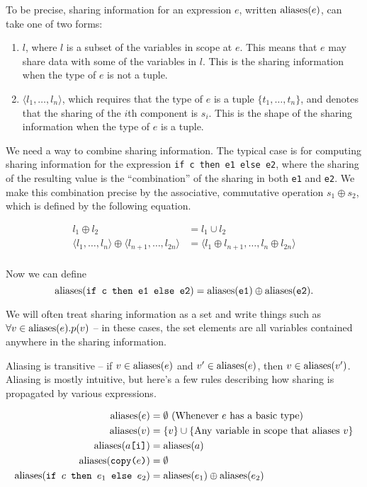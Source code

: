 To be precise, sharing information for an expression $e$, written
$\textrm{aliases}(e)$, can take one of two forms:

\begin{enumerate}
\item $l$, where $l$ is a subset of the variables in scope at $e$.
  This means that $e$ may share data with some of the variables in
  $l$.  This is the sharing information when the type of $e$ is not a
  tuple.

\item $\langle l_{1}, \ldots, l_{n} \rangle$, which requires that the
  type of $e$ is a tuple $\{t_{1}, \ldots, t_{n}\}$, and denotes that
  the sharing of the $i$th component is $s_{i}$.  This is the shape of
  the sharing information when the type of $e$ is a tuple.
\end{enumerate}

We need a way to combine sharing information.  The typical case is for
computing sharing information for the expression \texttt{if c then e1
  else e2}, where the sharing of the resulting value is the
``combination'' of the sharing in both \texttt{e1} and \texttt{e2}.
We make this combination precise by the associative, commutative
operation $s_{1} \oplus s_{2}$, which is defined by the following
equation.

\begin{align*}
  l_{1} \oplus l_{2} &= l_{1} \cup l_{2} \\
  \langle l_{1}, \ldots, l_{n} \rangle \oplus \langle l_{n+1}, \ldots, l_{2n} \rangle &= \langle l_{1} \oplus l_{n+1}, \ldots, l_{n} \oplus l_{2n} \rangle \\
\end{align*}

Now we can define
\[
\textrm{aliases}(\texttt{if c then e1 else e2}) = \textrm{aliases}(\texttt{e1}) \oplus \textrm{aliases}(\texttt{e2}).
\]

We will often treat sharing information as a set and write things such
as $\forall v\in\textrm{aliases}(e).p(v)$ -- in these cases, the set elements
are all variables contained anywhere in the sharing information.

Aliasing is transitive -- if $v\in\textrm{aliases}(e)$ and $v'\in\textrm{aliases}(e)$,
then $v\in\textrm{aliases}(v')$.  Aliasing is mostly intuitive, but here's a
few rules describing how sharing is propagated by various expressions.

\begin{align*}
  \textrm{aliases}(\texttt{$e$}) &= \emptyset\ (\text{Whenever $e$ has a basic type}) \\
  \textrm{aliases}(\texttt{$v$}) &= \{v\} \cup \{\textrm{Any variable in scope that aliases \(v\)}\} \\
  \textrm{aliases}(\texttt{$a$[i]}) &= \textrm{aliases}(a) \\
  \textrm{aliases}(\texttt{copy($e$)}) &= \emptyset \\
  \textrm{aliases}(\texttt{if $c$ then ${e}_{1}$ else ${e}_{2}$}) &= \textrm{aliases}(e_{1}) \oplus \textrm{aliases}(e_{2}) \\
\end{align*}

